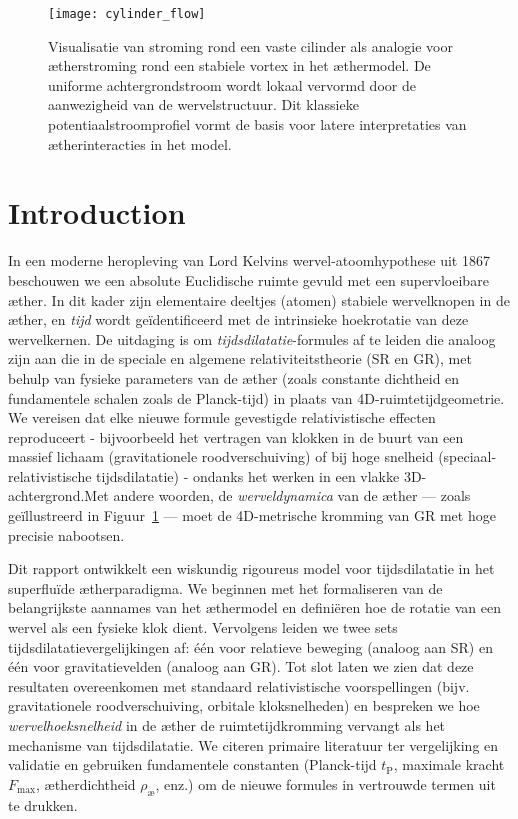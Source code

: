 \begin{figure}[htbp]
    \centering
    \texttt{[image: cylinder\_flow]}
    \caption{Visualisatie van stroming rond een vaste cilinder als analogie voor ætherstroming rond een stabiele vortex in het æthermodel. De uniforme achtergrondstroom wordt lokaal vervormd door de aanwezigheid van de wervelstructuur. Dit klassieke potentiaalstroomprofiel vormt de basis voor latere interpretaties van ætherinteracties in het model.}
    \label{fig:cylinderflow}
\end{figure}

\section{Introduction}
In een moderne heropleving van Lord Kelvins wervel-atoomhypothese uit 1867~\cite{Kelvin1867-vortex} beschouwen we een absolute Euclidische ruimte gevuld met een supervloeibare æther. In dit kader zijn elementaire deeltjes (atomen) stabiele wervelknopen in de æther, en \emph{tijd} wordt geïdentificeerd met de intrinsieke hoekrotatie van deze wervelkernen. De uitdaging is om \emph{tijdsdilatatie}-formules af te leiden die analoog zijn aan die in de speciale en algemene relativiteitstheorie (SR en GR), met behulp van fysieke parameters van de æther (zoals constante dichtheid en fundamentele schalen zoals de Planck-tijd) in plaats van 4D-ruimtetijdgeometrie. We vereisen dat elke nieuwe formule gevestigde relativistische effecten reproduceert - bijvoorbeeld het vertragen van klokken in de buurt van een massief lichaam (gravitationele roodverschuiving) of bij hoge snelheid (speciaal-relativistische tijdsdilatatie) - ondanks het werken in een vlakke 3D-achtergrond.Met andere woorden, de \emph{werveldynamica} van de æther — zoals geïllustreerd in Figuur~\ref{fig:cylinderflow} — moet de 4D-metrische kromming van GR met hoge precisie nabootsen.


Dit rapport ontwikkelt een wiskundig rigoureus model voor tijdsdilatatie in het superfluïde ætherparadigma. We beginnen met het formaliseren van
de belangrijkste aannames van het æthermodel en definiëren hoe de rotatie van een wervel als een fysieke klok dient. Vervolgens leiden we twee
sets tijdsdilatatievergelijkingen af: één voor relatieve beweging (analoog aan SR) en één voor gravitatievelden (analoog aan GR). Tot slot laten we zien dat deze resultaten overeenkomen met standaard relativistische voorspellingen (bijv. gravitationele roodverschuiving, orbitale kloksnelheden) en bespreken we hoe \emph{wervelhoeksnelheid} in de æther de ruimtetijdkromming vervangt als het mechanisme van tijdsdilatatie. We citeren primaire literatuur ter vergelijking en validatie en gebruiken fundamentele constanten (Planck-tijd $t_\textrm{P}$, maximale kracht $F_{\max}$, ætherdichtheid $\rho_{\text{\ae}}$, enz.) om de nieuwe formules in vertrouwde termen uit te drukken.